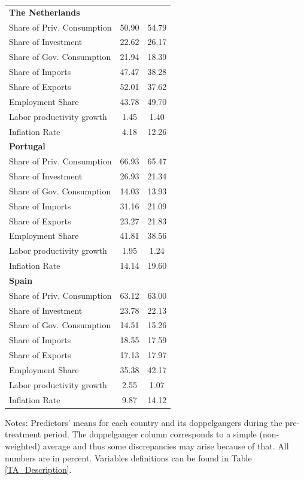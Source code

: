 \documentclass[12pt]{article}
\newcommand{\annote}[1]{\parbox{\textwidth}{\renewcommand{\baselinestretch}{1.0}\vspace{12pt} \small Notes: #1}}
\begin{document}
\begin{appendices}
\begin{center}
\begin{longtable}{lcc}
\textbf{The Netherlands} &  &  \\  
Share of Priv. Consumption &     50.90 &     54.79 \\  
Share of Investment &     22.62 &     26.17 \\  
Share of Gov. Consumption &     21.94 &     18.39 \\  
Share of Imports &     47.47 &     38.28 \\  
Share of Exports &     52.01 &     37.62 \\  
Employment Share &     43.78 &     49.70 \\  
Labor productivity growth &      1.45 &      1.40 \\  
Inflation Rate &      4.18 &     12.26 \\  \hline
\textbf{Portugal} &  &  \\  
Share of Priv. Consumption &     66.93 &     65.47 \\  
Share of Investment &     26.93 &     21.34 \\  
Share of Gov. Consumption &     14.03 &     13.93 \\  
Share of Imports &     31.16 &     21.09 \\  
Share of Exports &     23.27 &     21.83 \\  
Employment Share &     41.81 &     38.56 \\  
Labor productivity growth &      1.95 &      1.24 \\  
Inflation Rate &     14.14 &     19.60 \\   \hline
\textbf{Spain} &  &  \\  
Share of Priv. Consumption &     63.12 &     63.00 \\  
Share of Investment &     23.78 &     22.13 \\  
Share of Gov. Consumption &     14.51 &     15.26 \\  
Share of Imports &     18.55 &     17.59 \\  
Share of Exports &     17.13 &     17.97 \\  
Employment Share &     35.38 &     42.17 \\  
Labor productivity growth &      2.55 &      1.07 \\  
Inflation Rate &      9.87 &     14.12 \\  \hline
\hline \hline 
\end{longtable} 
\annote{Predictors' means for each country and its doppelgangers during the pre-treatment period. The doppelganger column corresponds to a simple (non-weighted) average and thus some discrepancies may arise because of that. All numbers are in percent. Variables definitions can be found in Table \ref{TA_Description}.}
\end{center}




\end{appendices}
\end{document}
